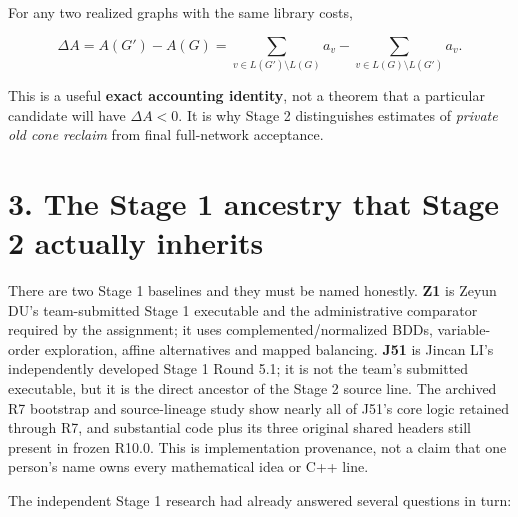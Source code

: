 For any two realized graphs with the same library costs,

\[
\Delta A=A(G')-A(G)
=\sum_{v\in L(G')\setminus L(G)}a_v
 -\sum_{v\in L(G)\setminus L(G')}a_v.
\]

This is a useful \textbf{exact accounting identity}, not a theorem that a particular candidate will have \(\Delta A<0\). It is why Stage 2 distinguishes estimates of \emph{private old cone reclaim} from final full-network acceptance.

\section{3. The Stage 1 ancestry that Stage 2 actually inherits}\label{the-stage-1-ancestry-that-stage-2-actually-inherits}

There are two Stage 1 baselines and they must be named honestly. \textbf{Z1} is Zeyun DU's team-submitted Stage 1 executable and the administrative comparator required by the assignment; it uses complemented/normalized BDDs, variable-order exploration, affine alternatives and mapped balancing. \textbf{J51} is Jincan LI's independently developed Stage 1 Round 5.1; it is not the team's submitted executable, but it is the direct ancestor of the Stage 2 source line. The archived R7 bootstrap and source-lineage study show nearly all of J51's core logic retained through R7, and substantial code plus its three original shared headers still present in frozen R10.0. This is implementation provenance, not a claim that one person's name owns every mathematical idea or C++ line.

The independent Stage 1 research had already answered several questions in turn:

